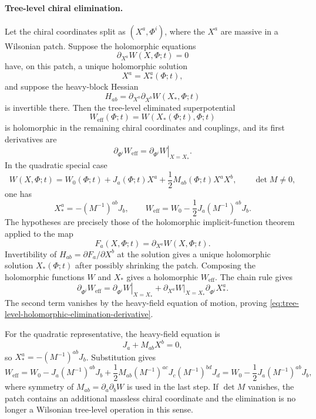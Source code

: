 \paragraph{Tree-level chiral elimination.}
Let the chiral coordinates split as \((X^a,\Phi^i)\), where the \(X^a\) are
massive in a Wilsonian patch.  Suppose the holomorphic equations
\[
  \partial_{X^a}W(X,\Phi;t)=0
\]
have, on this patch, a unique holomorphic solution
\[
  X^a=X_*^a(\Phi;t),
\]
and suppose the heavy-block Hessian
\[
  H_{ab}=\partial_{X^a}\partial_{X^b}W(X_*,\Phi;t)
\]
is invertible there.  Then the tree-level eliminated superpotential
\[
  W_{\mathrm{eff}}(\Phi;t)=W(X_*(\Phi;t),\Phi;t)
\]
is holomorphic in the remaining chiral coordinates and couplings, and its
first derivatives are
\begin{equation}
  \partial_{\Phi^i}W_{\mathrm{eff}}
  =
  \left.
  \partial_{\Phi^i}W
  \right|_{X=X_*}.
  \label{eq:tree-level-holomorphic-elimination-derivative}
\end{equation}
In the quadratic special case
\[
  W(X,\Phi;t)
  =
  W_0(\Phi;t)
  +J_a(\Phi;t)X^a
  +\frac12 M_{ab}(\Phi;t)X^aX^b,
  \qquad \det M\neq0,
\]
one has
\begin{equation}
  X_*^a=-(M^{-1})^{ab}J_b,
  \qquad
  W_{\mathrm{eff}}
  =
  W_0-\frac12J_a(M^{-1})^{ab}J_b .
  \label{eq:quadratic-chiral-elimination}
\end{equation}
The hypotheses are precisely those of the holomorphic implicit-function
theorem applied to the map
\[
  F_a(X,\Phi;t)=\partial_{X^a}W(X,\Phi;t).
\]
Invertibility of \(H_{ab}=\partial F_a/\partial X^b\) at the solution gives
a unique holomorphic solution \(X_*(\Phi;t)\) after possibly shrinking the
patch.  Composing the holomorphic functions \(W\) and \(X_*\) gives a
holomorphic \(W_{\mathrm{eff}}\).  The chain rule gives
\[
  \partial_{\Phi^i}W_{\mathrm{eff}}
  =
  \left.
  \partial_{\Phi^i}W
  \right|_{X=X_*}
  +
  \left.
  \partial_{X^a}W
  \right|_{X=X_*}
  \partial_{\Phi^i}X_*^a .
\]
The second term vanishes by the heavy-field equation of motion, proving
\eqref{eq:tree-level-holomorphic-elimination-derivative}.

For the quadratic representative, the heavy-field equation is
\[
  J_a+M_{ab}X^b=0,
\]
so \(X_*^a=-(M^{-1})^{ab}J_b\).  Substitution gives
\[
  W_{\mathrm{eff}}
  =
  W_0
  -J_a(M^{-1})^{ab}J_b
  +\frac12M_{ab}(M^{-1})^{ac}J_c(M^{-1})^{bd}J_d
  =
  W_0-\frac12J_a(M^{-1})^{ab}J_b ,
\]
where symmetry of \(M_{ab}=\partial_a\partial_bW\) is used in the last
step.  If \(\det M\) vanishes, the patch contains an additional massless
chiral coordinate and the elimination is no longer a Wilsonian tree-level
operation in this sense.

